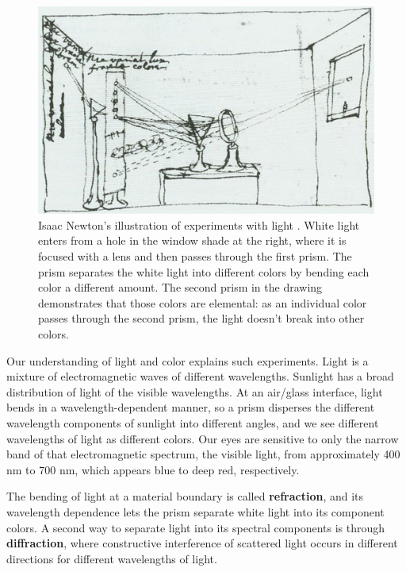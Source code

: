 \begin{figure}[htpb!]
\centerline{
\includegraphics[width=.9\linewidth]{figures/color/newtonDrawing.jpg}
}
\caption{Isaac Newton's illustration of experiments with light \cite{Fara2015}.  White
light enters from a hole in the window shade at the right, where it is
focused with a lens and then passes through the first
prism.  The prism separates the white light into different colors by
bending each color a different amount.  The second prism in the
drawing demonstrates that those colors are elemental:  as an individual
color passes through the second prism, the light doesn't break into
other colors.}
\label{fig:prism}
\end{figure}


Our understanding of light and color explains such experiments.  Light
is a mixture of electromagnetic waves of different wavelengths.
Sunlight has a broad distribution of
light of the visible wavelengths.  At an air/glass interface, light
bends in a wavelength-dependent manner, so a prism disperses the
different wavelength components of sunlight into different angles, and
we see different wavelengths of light as different colors.  
Our eyes are sensitive to only the narrow band of that electromagnetic
spectrum, the visible light, from approximately 400 nm 
to 700 nm, which appears blue to deep red, respectively.




The bending of light at a material boundary is called {\bf refraction}, and
its wavelength dependence lets the prism separate white light into its
component colors.  A second way to separate light into its spectral
components is through {\bf diffraction}, where constructive
interference of scattered light occurs in different directions for
different wavelengths of light. 

